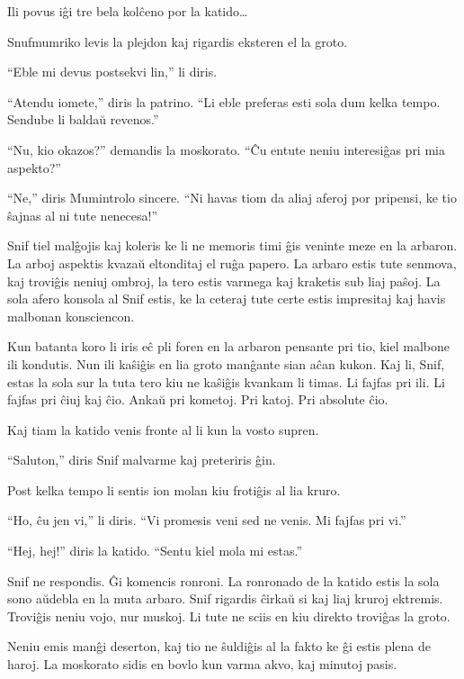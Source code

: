 Ili povus iĝi tre bela kolĉeno por la katido{\ldots}

Snufmumriko levis la plejdon kaj rigardis eksteren el la groto.

``Eble mi devus postsekvi lin,'' li diris.

``Atendu iomete,'' diris la patrino. ``Li eble preferas esti sola dum kelka tempo. Sendube li baldaŭ revenos.''

``Nu, kio okazos?'' demandis la moskorato. ``Ĉu entute neniu interesiĝas pri mia aspekto?''

``Ne,'' diris Mumintrolo sincere. ``Ni havas tiom da aliaj aferoj por pripensi, ke tio ŝajnas al ni tute nenecesa!''

\sectionbreak

Snif tiel malĝojis kaj koleris ke li ne memoris timi ĝis veninte meze en la arbaron. La arboj aspektis kvazaŭ eltonditaj el ruĝa papero. La arbaro estis tute senmova, kaj troviĝis neniuj ombroj, la tero estis varmega kaj kraketis sub liaj paŝoj. La sola afero konsola al Snif estis, ke la ceteraj tute certe estis impresitaj kaj havis malbonan konsciencon.

Kun batanta koro li iris eĉ pli foren en la arbaron pensante pri tio, kiel malbone ili kondutis. Nun ili kaŝiĝis en lia groto manĝante sian aĉan kukon. Kaj li, Snif, estas la sola sur la tuta tero kiu ne kaŝiĝis kvankam li timas. Li fajfas pri ili. Li fajfas pri ĉiuj kaj ĉio. Ankaŭ pri kometoj. Pri katoj. Pri absolute ĉio.

Kaj tiam la katido venis fronte al li kun la vosto supren.

``Saluton,'' diris Snif malvarme kaj preteriris ĝin.

Post kelka tempo li sentis ion molan kiu frotiĝis al lia kruro.

``Ho, ĉu jen vi,'' li diris. ``Vi promesis veni sed ne venis. Mi fajfas pri vi.''

``Hej, hej!'' diris la katido. ``Sentu kiel mola mi estas.''

Snif ne respondis. Ĝi komencis ronroni. La ronronado de la katido estis la sola sono aŭdebla en la muta arbaro. Snif rigardis ĉirkaŭ si kaj liaj kruroj ektremis. Troviĝis neniu vojo, nur muskoj. Li tute ne sciis en kiu direkto troviĝas la groto.

\sectionbreak

Neniu emis manĝi deserton, kaj tio ne ŝuldiĝis al la fakto ke ĝi estis plena de haroj. La moskorato sidis en bovlo kun varma akvo, kaj minutoj pasis.

